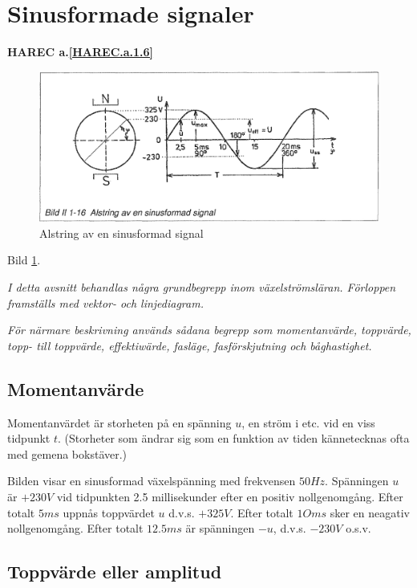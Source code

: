 \section{Sinusformade signaler}
\textbf{HAREC a.\ref{HAREC.a.1.6}\label{myHAREC.a.1.6}}

\begin{figure}
\begin{center}
\includegraphics[width=14cm]{images/bild_2_1-16}
\caption{Alstring av en sinusformad signal}
\label{fig:BildII1-16}
\end{center}
\end{figure}

Bild \ref{fig:BildII1-16}.

\emph{I detta avsnitt behandlas några grundbegrepp inom växelströmsläran. Förloppen
  framställs med vektor- och linjediagram.}

\emph{För närmare beskrivning används sådana begrepp som momentanvärde, toppvärde, topp- till
  toppvärde, effektiwärde, fasläge, fasförskjutning och båghastighet.}

\subsection{Momentanvärde}

Momentanvärdet är storheten på en spänning \(u\), en ström i etc. vid en viss tidpunkt \(t\).
(Storheter som ändrar sig som en funktion av tiden kännetecknas ofta med gemena bokstäver.)

Bilden visar en sinusformad växelspänning med frekvensen \(50 Hz\). Spänningen \(u\) är \(+230 V\) vid tidpunkten 2.5 millisekunder efter en positiv nollgenomgång. Efter totalt \(5 ms\)
uppnås toppvärdet \(u\) d.v.s. \(+325 V\). Efter totalt \(1O ms\) sker en neagativ
nollgenomgång. Efter totalt \(12.5 ms\) är spänningen \(-u\), d.v.s. \(-230 V\) o.s.v.

\subsection{Toppvärde eller amplitud}

